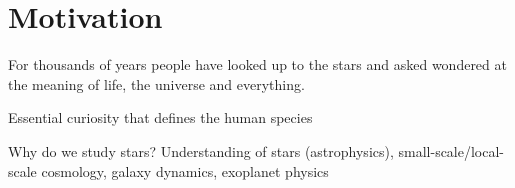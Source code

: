 \chapter*{Motivation}

For thousands of years people have looked up to the stars and asked wondered at the meaning of life, the universe and everything. 

Essential curiosity that defines the human species

Why do we study stars?
Understanding of stars (astrophysics), small-scale/local-scale cosmology, galaxy dynamics, exoplanet physics
